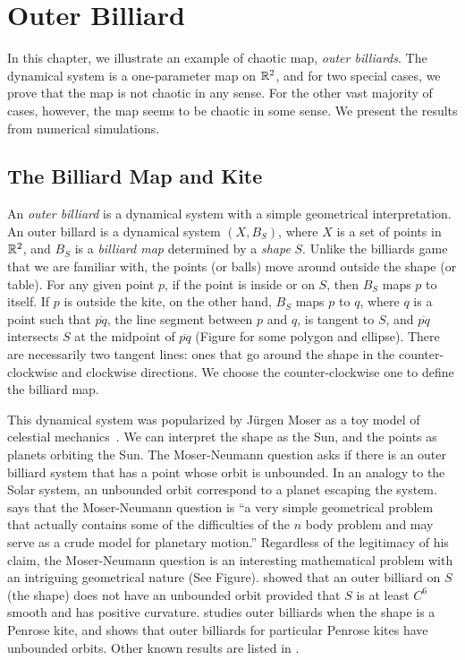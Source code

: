 \documentclass[12pt,twoside,draft]{book}
\begin{document}
\chapter{Outer Billiard}
In this chapter, we illustrate an example of chaotic map, \textit{outer billiards}.
The dynamical system is a one-parameter map on $\mathbb{R}^2$, and for two special cases, we prove that the map is not chaotic in any sense.
For the other vast majority of cases, however, the map seems to be chaotic in some sense.
We present the results from numerical simulations.

\section{The Billiard Map and Kite}
An \textit{outer billiard} is a dynamical system with a simple geometrical interpretation.
An outer billard is a dynamical system $(X, B_S)$, where $X$ is a set of points in $\mathbb{R}^2$, and $B_S$ is a \textit{billiard map} determined by a \textit{shape} $S$.
Unlike the billiards game that we are familiar with, the points (or balls) move around outside the shape (or table).
For any given point $p$, if the point is inside or on $S$, then $B_S$ maps $p$ to itself.
If $p$ is outside the kite, on the other hand, $B_S$ maps $p$ to $q$, where $q$ is a point such that $\overline{pq}$, the line segment between $p$ and $q$, is tangent to $S$, and $\overline{pq}$ intersects $S$ at the midpoint of $\overline{pq}$ (Figure for some polygon and ellipse).
There are necessarily two tangent lines: ones that go around the shape in the counter-clockwise and clockwise directions.
We choose the counter-clockwise one to define the billiard map.

This dynamical system was popularized by Jürgen Moser as a toy model of celestial mechanics~\citep{moser,moserbook}.
We can interpret the shape as the Sun, and the points as planets orbiting the Sun.
The Moser-Neumann question asks if there is an outer billiard system that has a point whose orbit is unbounded.
In an analogy to the Solar system, an unbounded orbit correspond to a planet escaping the system.
\citet{moser} says that the Moser-Neumann question is
``a very simple geometrical problem that actually contains some of the difficulties of the $n$ body problem and may serve as a crude model for planetary motion.''
Regardless of the legitimacy of his claim, the Moser-Neumann question is an interesting mathematical problem with an intriguing geometrical nature (See Figure).
\citet{moserbook} showed that an outer billiard on $S$ (the shape) does not have an unbounded orbit provided that $S$ is at least $C^6$ smooth and has positive curvature. 
\citet{schwartz} studies outer billiards when the shape is a Penrose kite, and shows that outer billiards for particular Penrose kites have unbounded orbits.
Other known results are listed in \citet[p. 2]{schwartz}.
\end{document}
